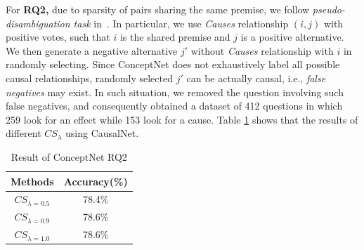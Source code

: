 \documentclass[letterpaper]{article}
\newcommand{\tabref}[1]{Table \ref{#1}}
\begin{document}
For {\bf RQ2,}
due to sparsity of pairs sharing the same premise,
we follow \emph{pseudo-disambiguation task} in~\cite{Erk}.
In particular, we use \emph{Causes} relationship $(i,j)$ with
positive votes, such that $i$ is the shared premise and $j$ is a
positive alternative. We then generate a negative alternative
$j'$ without \emph{Causes} relationship with $i$ in randomly selecting.
Since ConceptNet does not exhaustively
label all possible causal relationships, randomly selected $j'$ can
be actually causal, i.e., \emph{false negatives} may exist. In such
situation, we removed the question involving such false negatives,
and consequently obtained a dataset of 412 questions in which 259
look for an effect while 153 look for a cause. \tabref{tab:rq2}
shows that the results of different $CS_\lambda$
using CausalNet.

\begin{table}[th]
\centering
\caption{Result of ConceptNet RQ2}
\begin{tabular}{cc}
\hline
Methods & Accuracy(\%) \\
\hline
$CS_{\lambda=0.5}$ & 78.4\%  \\
$CS_{\lambda=0.9}$ & 78.6\%  \\
$CS_{\lambda=1.0}$ & 78.6\%  \\
\hline
\end{tabular}
\label{tab:rq2}
\end{table}
\end{document}
